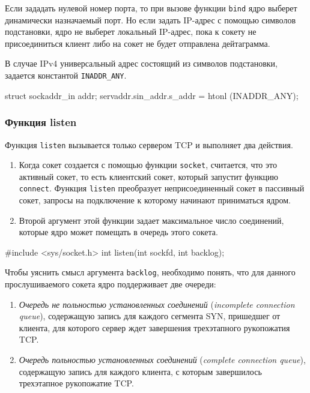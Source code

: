 Если зададать нулевой номер порта, то при вызове функции \lstinline{bind} ядро выберет динамически назначаемый порт. Но если задать IP-адрес с помощью символов подстановки, ядро не выберет локальный IP-адрес, пока к сокету не присоединиться клиент либо на сокет не будет отправлена дейтаграмма.

В случае IPv4 универсальный адрес состоящий из символов подстановки, задается константой \lstinline{INADDR_ANY}.
\begin{clst}{}{}
struct sockaddr_in addr;
servaddr.sin_addr.s_addr = htonl (INADDR_ANY);
\end{clst}

\subsubsection{Функция listen}
Функция \lstinline{listen} вызывается только сервером TCP и выполняет два действия.
\begin{enumerate}
  \item Когда сокет создается с помощью функции \lstinline{socket}, считается, что это активный сокет, то есть клиентский сокет, который запустит функцию \lstinline{connect}. Функция \lstinline{listen} преобразует неприсоединенный сокет в пассивный сокет, запросы на подключение к которому начинают приниматься ядром.
  \item Второй аргумент этой функции задает максимальное число соединений, которые ядро может помещать в очередь этого сокета.
\end{enumerate}

\begin{clst}{}{}
#include <sys/socket.h>
int listen(int sockfd, int backlog);
\end{clst}{}{}

Чтобы уяснить смысл аргумента \lstinline{backlog}, необходимо понять, что для данного прослушиваемого сокета ядро поддерживает две очереди:
\begin{enumerate}
  \item \emph{Очередь не польностью установленных соединений} (\emph{incomplete connection queue}), содержащую запись для каждого сегмента SYN, пришедшег от клиента, для которого сервер ждет завершения трехэтапного рукопожатия TCP.
  \item \emph{Очередь польностью установленных соединений} (\emph{complete connection queue}), содержащую запись для каждого клиента, с которым завершилось трехэтапное рукопожатие TCP.
\end{enumerate}

